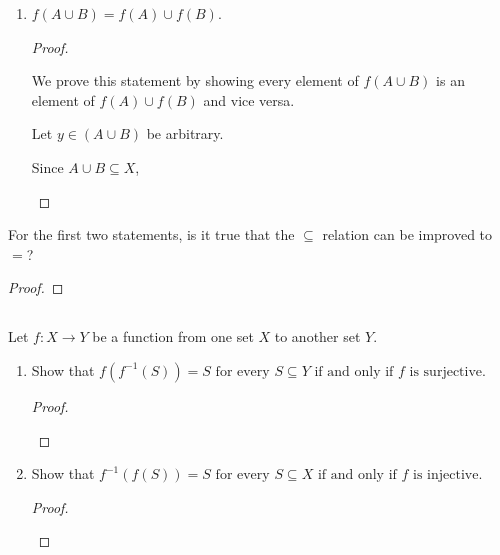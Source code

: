 \documentclass[../../main.tex]{subfiles}
\begin{document}
\begin{q}
\begin{enumerate}
        \item $f(A \cup B) = f(A) \cup f(B)$.
        \begin{proof}

            \begin{xx}
                We prove this statement by showing every element of $f(A \cup B)$ is an element of $f(A) \cup f(B)$ and vice versa.
                
                Let $y \in (A \cup B)$ be arbitrary.

                Since $A \cup B \subseteq X$,
            \end{xx}
        \end{proof}
        
    \end{enumerate}
    For the first two statements, is it true that the $\subseteq$ relation can be improved to $=$?

    \begin{ans}
    
    \end{ans}
    \begin{proof}
        
    \end{proof}
\end{q}

\addtocounter{subsection}{1}
\subsection{}
\begin{q}
    Let $f \colon X \to Y$ be a function from one set $X$ to another set $Y$. 
    
    \begin{enumerate}
        \item
        Show that $f(f^{-1}(S)) = S \text{ for every } S \subseteq Y \text{ if and only if } f \text{ is surjective.}$
        \begin{proof}
            
            \begin{xx}
                
            \end{xx}
        \end{proof}

        \item 
        Show that \(f^{-1}(f(S)) = S \text{ for every } S \subseteq X \text{ if and only if } f \text{ is injective.}\)
        \begin{proof}
            
            \begin{xx}
                
            \end{xx}
        \end{proof}
    \end{enumerate}

\end{q}
\end{document}
